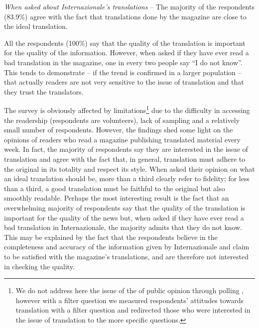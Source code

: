 \documentclass[output=paper]{LSP/langsci}
\begin{document}
\textit{When asked about Interna}\textit{zionale'}\textit{s translations} -- The majority of the respondents (83.9\%) agree with the fact that translations done by the magazine are close to the ideal translation. 

All the respondents (100\%) say that the quality of the translation is important for the quality of the information. However, when asked if they have ever read a bad translation in the magazine, one in every two people say ``I do not know''. This tends to demonstrate -- if the trend is confirmed in a larger population -- that actually readers are not very sensitive to the issue of translation and that they trust the translators. 

The survey is obviously affected by limitations\footnote{We do not address here the issue of the  of public opinion through polling \citep[149--157]{Bourdieu1993}, however with a filter question  we measured respondents’ attitudes towards translation with a filter question and redirected those who were interested in the issue of translation to the more specific questions.}  due to the difficulty in accessing the readership (respondents are volunteers), lack of sampling and a relatively small number of respondents. However, the findings shed some light on the opinions of readers who read a magazine publishing translated material every week. In fact, the majority of respondents say they are interested in the issue of translation and agree with the fact that, in general, translation must adhere %
to the original in its totality and respect its style. When asked their opinion on what an ideal translation should be, more than a third clearly refer to fidelity; for less than a third, a good translation must be faithful to the original but also smoothly readable. Perhaps the most interesting result is the fact that an overwhelming majority of respondents say that the quality of the translation is important for the quality of the news but, when asked if they have ever read a bad translation in Internazionale, the majority admits that they do not know. This may be explained by the fact that the respondents believe in the completeness and accuracy of the information given by Internazionale and claim to be satisfied with the magazine's translations, and are therefore not interested in checking the %
%
%
quality. 
\end{document}

